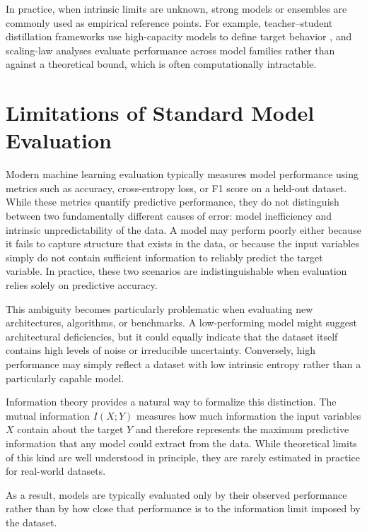 \documentclass{article}
\begin{document}
In practice, when intrinsic limits are unknown, strong models or ensembles are commonly used as empirical reference points. 
For example, teacher–student distillation frameworks use high-capacity models to define target behavior \cite{hinton2015distilling}, 
and scaling-law analyses evaluate performance across model families \cite{kaplan2020scaling} rather than against a theoretical bound, 
which is often computationally intractable.



\section{Limitations of Standard Model Evaluation}

Modern machine learning evaluation 
typically measures model performance using metrics such as accuracy, cross-entropy loss, 
or F1 score on a held-out dataset. 
While these metrics quantify predictive performance, they do not distinguish between two 
fundamentally different causes of error: model inefficiency and intrinsic unpredictability of the data. 
A model may perform poorly either because it fails to capture structure that exists in the data, 
or because the input variables simply do not contain sufficient information to reliably predict the target variable. 
In practice, these two scenarios are indistinguishable when evaluation relies solely on predictive accuracy.

This ambiguity becomes particularly problematic when evaluating new architectures, 
algorithms, or benchmarks. 
A low-performing model might suggest architectural deficiencies, 
but it could equally indicate that the dataset itself contains high levels of noise or irreducible uncertainty. 
Conversely, high performance may simply reflect a dataset with low intrinsic entropy rather than a particularly capable model.

Information theory provides a natural way to formalize this distinction. The mutual information $I(X ; Y)$  measures how much information the input variables 
$X$ contain about the target 
$Y$ and therefore represents the maximum predictive information 
that any model could extract from the data. While theoretical limits of this kind are well 
understood in principle, they are rarely estimated in practice for real-world datasets. 

As a result, models are typically evaluated only by their observed performance rather than by how close that performance is to the information limit imposed by the dataset.
\end{document}
